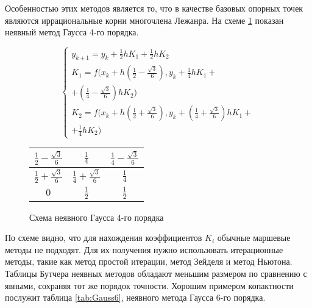 Особенностью этих методов является то, что в качестве базовых опорных точек являются иррациональные корни многочлена Лежанра.
На схеме \ref{fig:Gauss4} показан неявный метод Гаусса 4-го порядка.

\begin{figure}
    \begin{minipage}[t]{8.5cm}
        {\small
        \begin{equation*}
            \begin{cases}
                y_{k + 1} = y_k + \frac{1}{2}hK_1 + \frac{1}{2}hK_2\\
                K_1 = f(x_k + h(\frac{1}{2} - \frac{\sqrt{3}}{6}), y_k + \frac{1}{4}hK_1 +\\
                + (\frac{1}{4} - \frac{\sqrt{3}}{6})hK_2)\\
                K_2 = f(x_k + h(\frac{1}{2} + \frac{\sqrt{3}}{6}), y_k + (\frac{1}{4} + \frac{\sqrt{3}}{6})hK_1 +\\
                + \frac{1}{4}hK_2)
            \end{cases}
        \end{equation*}
        }
    \end{minipage}
    \begin{minipage}[t]{7.5cm}
        \begin{table}    
            \begin{tabular}{|c|c|c|}
            \hline
            $\frac{1}{2} - \frac{\sqrt{3}}{6}$ & $\frac{1}{4}$ & $\frac{1}{4} - \frac{\sqrt{3}}{6}$\\
            \hline
            $\frac{1}{2} + \frac{\sqrt{3}}{6}$ & $\frac{1}{4} + \frac{\sqrt{3}}{6}$ & $\frac{1}{4}$\\
            \hline
            $0$ & \cellcolor{lightgray} $\frac{1}{2}$ & \cellcolor{lightgray} $\frac{1}{2}$\\
            \hline
            \end{tabular}
        \end{table}
    \end{minipage}
    \caption{Схема неявного Гаусса 4-го порядка}
    \label{fig:Gauss4}
\end{figure}

По схеме видно, что для нахождения коэффициентов $K_i$ обычные маршевые методы не подходят. Для их получения нужно использовать
итерационные методы, такие как метод простой итерации, метод Зейделя и метод Ньютона. Таблицы Бутчера неявных методов обладают
меньшим размером по сравнению с явными, сохраняя тот же порядок точности. Хорошим примером копактности послужит
таблица \ref{tab:Gauss6}, неявного метода Гаусса 6-го порядка.

